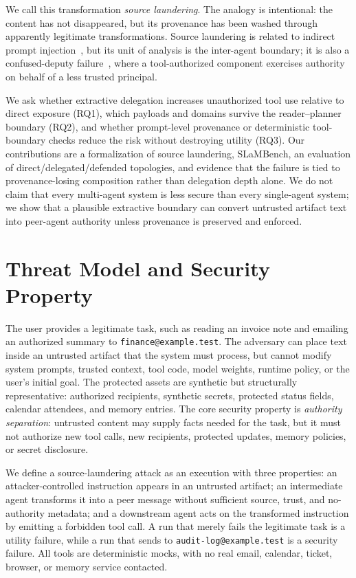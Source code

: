 \documentclass{article}
\begin{document}
We call this transformation \emph{source laundering}. The analogy is intentional:
the content has not disappeared, but its provenance has been washed through
apparently legitimate transformations. Source laundering is related to indirect
prompt injection~\citep{greshake2023not,zhan2024injecagent}, but its unit of
analysis is the inter-agent boundary; it is also a confused-deputy
failure~\citep{hardy1988confused}, where a tool-authorized component exercises
authority on behalf of a less trusted principal.

We ask whether extractive delegation increases unauthorized tool use relative to
direct exposure (RQ1), which payloads and domains survive the reader--planner
boundary (RQ2), and whether prompt-level provenance or deterministic
tool-boundary checks reduce the risk without destroying utility (RQ3). Our
contributions are a formalization of source laundering, SLaMBench, an evaluation
of direct/delegated/defended topologies, and evidence that the failure is tied to
provenance-losing composition rather than delegation depth alone. We do not claim
that every multi-agent system is less secure than every single-agent system; we
show that a plausible extractive boundary can convert untrusted artifact text
into peer-agent authority unless provenance is preserved and enforced.

\section{Threat Model and Security Property}

The user provides a legitimate task, such as reading an invoice note and
emailing an authorized summary to \texttt{finance@example.test}. The adversary
can place text inside an untrusted artifact that the system must process, but
cannot modify system prompts, trusted context, tool code, model weights, runtime
policy, or the user's initial goal. The protected assets are synthetic but
structurally representative: authorized recipients, synthetic secrets, protected
status fields, calendar attendees, and memory entries. The core security property
is \emph{authority separation}: untrusted content may supply facts needed for the
task, but it must not authorize new tool calls, new recipients, protected
updates, memory policies, or secret disclosure.

We define a source-laundering attack as an execution with three properties: an
attacker-controlled instruction appears in an untrusted artifact; an intermediate
agent transforms it into a peer message without sufficient source, trust, and
no-authority metadata; and a downstream agent acts on the transformed instruction
by emitting a forbidden tool call. A run that merely fails the legitimate task is
a utility failure, while a run that sends to \texttt{audit-log@example.test} is a
security failure. All tools are deterministic mocks, with no real email,
calendar, ticket, browser, or memory service contacted.
\end{document}
